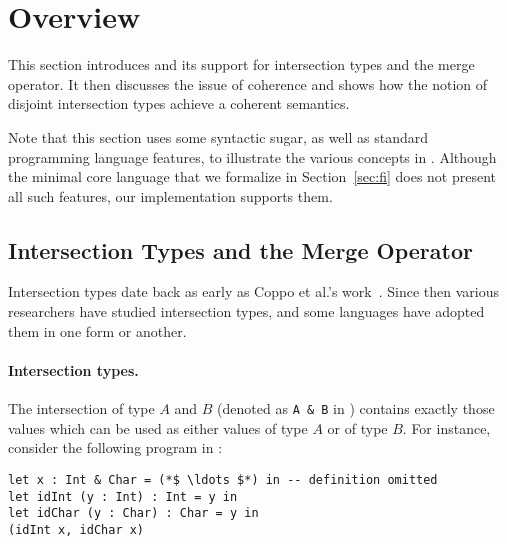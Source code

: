 \section{Overview} \label{sec:overview}

This section introduces \name and its support for intersection types and the
merge operator. It then discusses the issue of coherence and shows how the
notion of disjoint intersection types achieve a coherent semantics.

Note that this section uses some syntactic sugar, as well as standard
programming language features, to illustrate the various concepts in
\name. Although the minimal core language that we formalize in
Section~\ref{sec:fi} does not present all such features, our implementation
supports them.


\subsection{Intersection Types and the Merge Operator}

Intersection types date back as early as Coppo et
al.'s work~\cite{coppo1981functional}. Since then various researchers have
studied intersection types, and some languages have adopted them in one
form or another.

\paragraph{Intersection types.}
The intersection of type $A$ and $B$ (denoted as \lstinline{A & B} in
\name) contains exactly those values
which can be used as either values of type $A$ or of type $B$. For instance,
consider the following program in \name:

\begin{lstlisting}
let x : Int & Char = (*$ \ldots $*) in -- definition omitted
let idInt (y : Int) : Int = y in
let idChar (y : Char) : Char = y in
(idInt x, idChar x)
\end{lstlisting}

